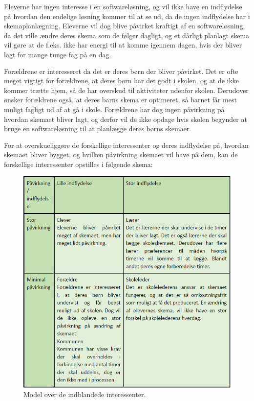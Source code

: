 Eleverne har ingen interesse i en softwareløsning, og vil ikke have en indflydelse på hvordan den endelige løsning kommer til at se ud, da de ingen indflydelse har i skemaplanlægning. Eleverne vil dog blive påvirket kraftigt af en softwareløsning, da det ville ændre deres skema som de følger dagligt, og et dårligt planlagt skema vil gøre at de f.eks. ikke har energi til at komme igennem dagen, hvis der bliver lagt for mange tunge fag på en dag.


Forældrene er interesseret da det er deres børn der bliver påvirket. Det er ofte meget vigtigt for forældrene, at deres børn har det godt i skolen, og at de ikke kommer trætte hjem, så de har overskud til aktiviteter udenfor skolen. Derudover ønsker forældrene også, at deres barns skema er optimeret, så barnet får mest muligt fagligt ud af at gå i skole. Forældrene har dog ingen påvirkning på hvordan skemaet bliver lagt, og derfor vil de ikke opdage hvis skolen begynder at bruge en softwareløsning til at planlægge deres børns skemaer.

For at overskueliggøre de forskellige interessenter og deres indflydelse på, hvordan skemaet bliver bygget, og hvilken påvirkning skemaet vil have på dem, kan de forskellige interessenter opstilles i følgende skema:
\begin{figure}[!h]
  \centering
  \includegraphics[width=\textwidth]{partials/graphics/interessentanalyse.png}
  \caption{Model over de indblandede interessenter.}
  \label{fig:interessenter}
\end{figure}
